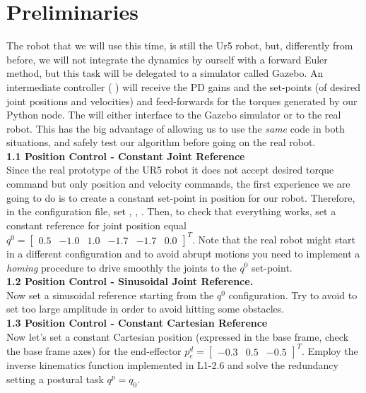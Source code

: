 \documentclass[11pt]{article}
\newcommand{\mat}[1]{\ensuremath{\begin{bmatrix}#1\end{bmatrix}}}	%
\begin{document}
\section{Preliminaries}
	The robot that we will use this time, is still the  Ur5 robot, but, differently from before, we will not integrate the dynamics by ourself with a forward Euler method,  but this task will be delegated to a simulator called Gazebo. An intermediate controller ( ) will receive the PD gains and the set-points (of desired joint positions and velocities) and feed-forwards for the torques generated by our Python node.
	The   will either interface to the  Gazebo simulator or to the real robot. This has the big advantage of  allowing us to use the \textit{same} code in both situations, and safely test our algorithm before going on the real robot.\\

\textbf{1.1 Position Control - Constant Joint Reference}\\
Since the real prototype of the UR5 robot it does not accept desired torque command but only position and velocity commands, 
the first experience we are going to do is to create a constant set-point in position for our robot. 
Therefore, in the  configuration file, set ,   
, .
Then, to check that everything works, set a constant reference for joint position equal $q^0=\mat{ 0.5& -1.0& 1.0& -1.7& -1.7& 0.0}^T$.
Note that the real robot might start in a different configuration and to avoid abrupt motions you need to implement a \textit{homing} procedure to drive smoothly the joints to  the  $q^0$ set-point. \\

\textbf{1.2 Position Control - Sinusoidal  Joint Reference.}\\
Now set a sinusoidal reference starting from the  $q^0$ configuration. Try to avoid to set too large amplitude in order to avoid hitting some obstacles. \\

\textbf{1.3 Position Control - Constant Cartesian Reference}\\
Now let's set a constant Cartesian position (expressed in the base frame, check the base frame axes) 
for the end-effector $p_e^d=\mat{-0.3&  0.5& -0.5}^T   $. Employ the inverse kinematics function implemented in L1-2.6 and solve the redundancy  setting a postural task $q^p = q_0$.\\
\end{document}
